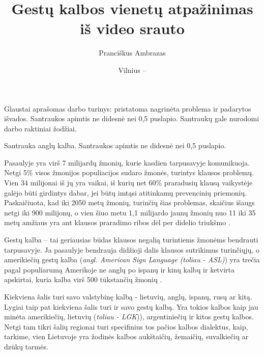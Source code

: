 \documentclass{VUMIFPSbakalaurinis}
\title{Gestų kalbos vienetų atpažinimas iš video srauto}
\author{Pranciškus Ambrazas}
\date{Vilnius – \the\year}
\begin{document}
\maketitle


Glaustai aprašomas darbo turinys: pristatoma nagrinėta problema ir padarytos
išvados. Santraukos apimtis ne didesnė nei 0,5 puslapio. Santraukų gale
nurodomi darbo raktiniai žodžiai. 

Santrauka anglų kalba. Santraukos apimtis ne didesnė nei 0,5 puslapio.

\tableofcontents

Pasaulyje yra virš 7 milijardų žmonių, kurie kasdien tarpusavyje komunikuoja. Netgi 5\% visos žmonijos populiacijos sudaro žmonės, turintys klausos problemų. Vien 34 milijonai iš jų yra vaikai, iš kurių net 60\% praradusių klausą vaikystėje galėjo būti girdintys dabar, jei būtų imtąsi atitinkamų prevencinių priemonių. Paskaičiuota, kad iki 2050 metų žmonių, turinčių šias problemas, skaičius išaugs netgi iki 900 milijonų, o vien šiuo metu 1,1 milijardo jaunų žmonių nuo 11 iki 35 metų amžiaus yra ant klausos praradimo ribos dėl per didelio triukšmo \cite{WhoInt}.

Gestų kalba – tai geriausias būdas klausos negalią turintiems žmonėms bendrauti tarpusavyje. Ja pasaulyje bendrauja didžioji dalis klausos sutrikimus turinčiųjų, o amerikiečių gestų kalba (\textit{angl. American Sign Language (toliau - ASL)}) yra trečia pagal populiarumą Amerikoje ne anglų po ispanų ir kinų kalbų ir ketvirta apskirtai, kuria kalba virš 500 tūkstančių žmonių \cite{Gall}. 

Kiekviena šalis turi savo valstybinę kalbą - lietuvių, anglų, ispanų, rusų ar kitą. Lygiai taip pat kiekviena šalis turi ir savo gestų kalbą. Yra tokios kalbos kaip jau minėta amerikiečių, lietuvių (\textit{toliau - LGK})), argentiniečių ir kitos gestų kalbos. Netgi tam tikri šalių regionai turi specifinius tos pačios kalbos dialektus, kaip, tarkime, vien Lietuvoje yra žodinės kalbos aukštaičių, žemaičių, suvalkiečių ar dzūkų tarmės. 
\end{document}
